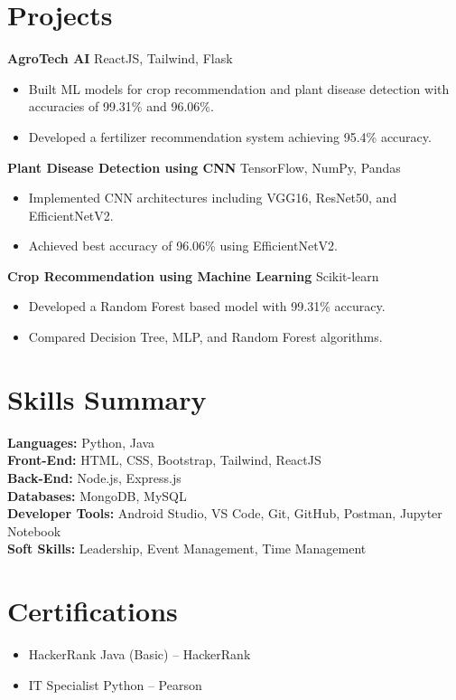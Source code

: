 \documentclass[11pt,a4paper]{article}
\begin{document}
\section{Projects}
\textbf{AgroTech AI} \hfill ReactJS, Tailwind, Flask\\
\begin{itemize}
    \item Built ML models for crop recommendation and plant disease detection with accuracies of 99.31\% and 96.06\%.
    \item Developed a fertilizer recommendation system achieving 95.4\% accuracy.
\end{itemize}

\textbf{Plant Disease Detection using CNN} \hfill TensorFlow, NumPy, Pandas\\
\begin{itemize}
    \item Implemented CNN architectures including VGG16, ResNet50, and EfficientNetV2.
    \item Achieved best accuracy of 96.06\% using EfficientNetV2.
\end{itemize}

\textbf{Crop Recommendation using Machine Learning} \hfill Scikit-learn\\
\begin{itemize}
    \item Developed a Random Forest based model with 99.31\% accuracy.
    \item Compared Decision Tree, MLP, and Random Forest algorithms.
\end{itemize}

\section{Skills Summary}
\textbf{Languages:} Python, Java\\
\textbf{Front-End:} HTML, CSS, Bootstrap, Tailwind, ReactJS\\
\textbf{Back-End:} Node.js, Express.js\\
\textbf{Databases:} MongoDB, MySQL\\
\textbf{Developer Tools:} Android Studio, VS Code, Git, GitHub, Postman, Jupyter Notebook\\
\textbf{Soft Skills:} Leadership, Event Management, Time Management

\section{Certifications}
\begin{itemize}
    \item HackerRank Java (Basic) -- HackerRank
    \item IT Specialist Python -- Pearson
\end{itemize}
\end{document}
